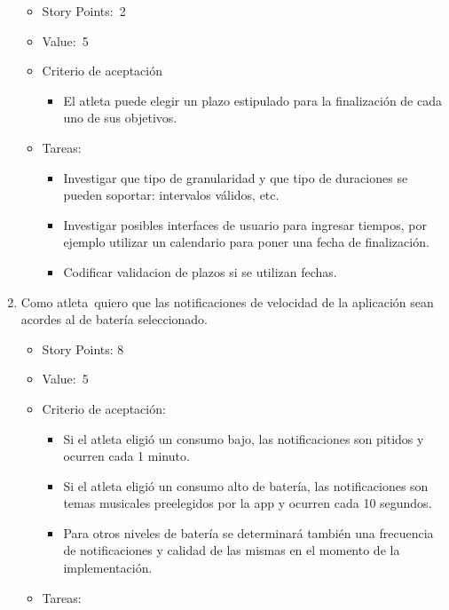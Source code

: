 \begin{enumerate}
  \begin{itemize}
  \item
    Story Points:~2
  \item
    Value:~5
  \item
    Criterio de aceptación

    \begin{itemize}
    \itemsep1pt\parskip0pt
    \item
      El atleta puede elegir un plazo estipulado para la finalización de
      cada uno de sus objetivos.
    \end{itemize}
  \item
    Tareas:

    \begin{itemize}
    \itemsep1pt\parskip0pt
    \item
      Investigar que tipo de granularidad y que tipo de duraciones se
      pueden soportar: intervalos válidos, etc.
    \item
      Investigar posibles interfaces de usuario para ingresar tiempos,
      por ejemplo utilizar un calendario para poner una fecha de
      finalización.
    \item
      Codificar validacion de plazos si se utilizan fechas.
    \end{itemize}
  \end{itemize}
\item
  Como atleta~quiero que las notificaciones de velocidad de la
  aplicación sean acordes al de batería seleccionado.

  \begin{itemize}
  \item
    Story Points: 8
  \item
    Value:~5
  \item
    Criterio de aceptación:

    \begin{itemize}
    \item
      Si el atleta eligió un consumo bajo, las notificaciones son
      pitidos y ocurren cada 1 minuto.
    \item
      Si el atleta eligió un consumo alto de batería, las notificaciones
      son temas musicales preelegidos por la app y ocurren cada 10
      segundos.
    \item
      Para otros niveles de batería se determinará también una
      frecuencia de notificaciones y calidad de las mismas en el momento
      de la implementación.
    \end{itemize}
  \item
    Tareas:


\end{itemize}
\end{enumerate}
